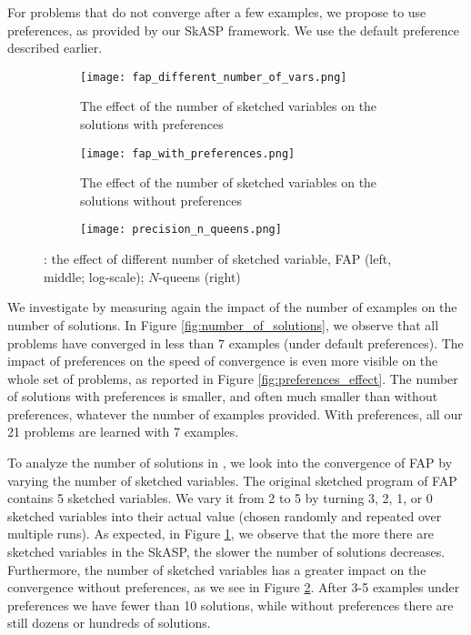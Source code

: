 For problems that do not converge after a few examples, we propose to 
use preferences, as provided by our SkASP framework. 
We use the default preference described earlier. 

\begin{figure*}[tb]
  \centering
\begin{subfigure}[t]{0.325\textwidth}
  \texttt{[image: fap\_different\_number\_of\_vars.png]}
  \caption{The effect of the number of sketched variables on the solutions with preferences}
  \label{fig:fap_with_preferences}
  \end{subfigure}
    \hfill
\begin{subfigure}[t]{0.325\textwidth}
  \texttt{[image: fap\_with\_preferences.png]}
  \caption{The effect of the number of sketched variables on the solutions without preferences}
  \label{fig:fap_without_preferences}
  \end{subfigure}
  \hfill
\begin{subfigure}[t]{0.325\textwidth}
  \texttt{[image: precision\_n\_queens.png]}
  \caption{}
  \label{fig:precision_n_queens}
  \end{subfigure}
  \caption{\qthree: the effect of different number of sketched variable, FAP (left, middle; log-scale); $N$-queens (right)}
  \label{fig:second_row}
\end{figure*}


We investigate \qtwo by  measuring again the impact of the number of examples 
on the number of solutions. 
In Figure \ref{fig:number_of_solutions}, we observe that all problems 
have converged in less than 7 examples (under default preferences). 
The impact of preferences on the speed 
of convergence is even more visible on the whole set of problems, as reported in 
Figure \ref{fig:preferences_effect}. 
The number of solutions with preferences is smaller, and often much smaller 
than without preferences, whatever the  
number of examples provided. 
With preferences, all our 21 problems are learned with 7 examples.  



To analyze the number of solutions in \qthree, we look into the convergence of FAP  
by varying the number of sketched variables. The original 
sketched program of FAP contains 5 sketched variables. 
We vary it from 2 to 5 by turning 3, 2, 1, or 0 sketched variables into 
their actual value (chosen randomly and repeated over multiple runs). As expected, in Figure \ref{fig:fap_with_preferences}, we observe that 
the more there are sketched variables in the SkASP, the slower the number 
of solutions decreases. Furthermore, the number of sketched variables has a greater impact on the convergence without preferences, as we see in Figure \ref{fig:fap_without_preferences}. After 3-5 examples under preferences we have fewer than 10 solutions, while without preferences there are still dozens or hundreds of solutions.

